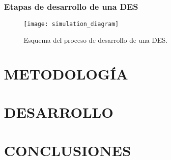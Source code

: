 \documentclass[12pt]{article}
\begin{document}
\subsubsection{Etapas de desarrollo de una DES}

\begin{figure}
    \begin{center}
        \texttt{[image: simulation\_diagram]}
    \end{center}
    \caption{Esquema del proceso de desarrollo de una DES.}
    \label{fig:simulation_diagram}
\end{figure}


\section{METODOLOGÍA}
\section{DESARROLLO}
\section{CONCLUSIONES}

\newpage 



\end{document}
